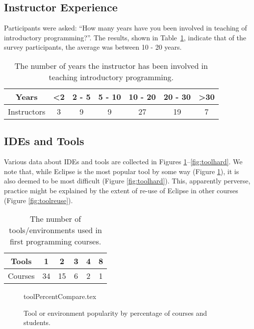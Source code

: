 \documentclass{sig-alternate}
\begin{document}
\subsection{Instructor Experience}
Participants were asked: ``How many years have you been involved in teaching of introductory programming?''. The results, shown in Table~\ref{tab:yearsTeaching}, indicate that of the survey participants, the average was between 10 - 20 years.

\begin{table}[]
\centering
\caption{The number of years the instructor has been involved in teaching introductory programming.}
\label{tab:yearsTeaching}
\begin{tabular}{ccccccc}
\hline
Years       & \textless 2 & 2 - 5 & 5 - 10 & 10 - 20 & 20 - 30 & \textgreater 30 \\ \hline
Instructors & 3          & 9     & 9      & 27      & 19      & 7              \\ \hline
\end{tabular}
\end{table}

\subsection{IDEs and Tools}
Various data about IDEs and tools are collected in Figures \ref{fig:tools}--\ref{fig:toolhard}. We note that, while Eclipse is the most popular tool by some way (Figure \ref{fig:tools}), it is also deemed to be most difficult (Figure \ref{fig:toolhard}). This, apparently perverse, practice might be explained by the extent of re-use of Eclipse in other courses (Figure \ref{fig:toolreuse}).
\begin{table}[]
\centering
\caption{The number of tools/environments used in first programming courses.}
\label{tab:numTools}
\begin{tabular}{cccccc}
\hline
Tools   & 1  & 2  & 3 & 4 & 8 \\ \hline
Courses & 34 & 15 & 6 & 2 & 1 \\ \hline
\end{tabular}
\end{table}

\begin{figure}
\begin{center}
{toolPercentCompare.tex}
\caption{Tool or environment popularity by percentage of courses and students.\label{fig:tools}}
\end{center}
\end{figure}
\end{document}
